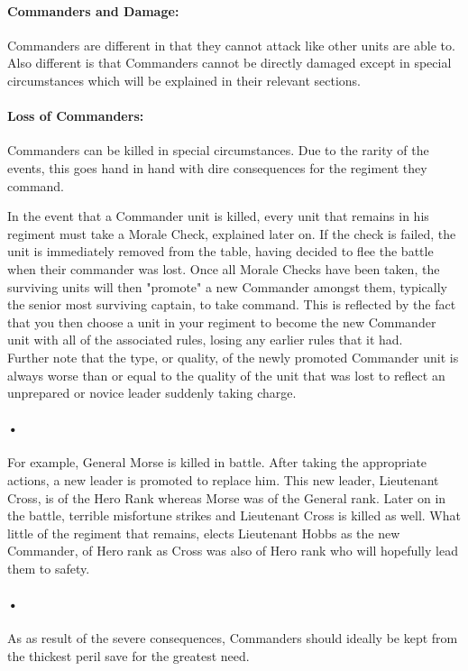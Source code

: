 \documentclass{article}
\begin{document}
\paragraph{Commanders and Damage:} Commanders are different in that they cannot attack like other units are able to. Also different is that Commanders cannot be directly damaged except in special circumstances which will be explained in their relevant sections.

\paragraph{Loss of Commanders:} Commanders can be killed in special circumstances. Due to the rarity of the events, this goes hand in hand with dire consequences for the regiment they command.

In the event that a Commander unit is killed, every unit that remains in his regiment must take a Morale Check, explained later on. If the check is failed, the unit is immediately removed from the table, having decided to flee the battle when their commander was lost. Once all Morale Checks have been taken, the surviving units will then "promote" a new Commander amongst them, typically the senior most surviving captain, to take command. This is reflected by the fact that you then choose a unit in your regiment to become the new Commander unit with all of the associated rules, losing any earlier rules that it had.
\\
Further note that the type, or quality, of the newly promoted Commander unit is always worse than or equal to the quality of the unit that was lost to reflect an unprepared or novice leader suddenly taking charge.

\paragraph{•}
For example, General Morse is killed in battle. After taking the appropriate actions, a new leader is promoted to replace him. This new leader, Lieutenant Cross, is of the Hero Rank whereas Morse was of the General rank. Later on in the battle, terrible misfortune strikes and Lieutenant Cross is killed as well. What little of the regiment that remains, elects Lieutenant Hobbs as the new Commander, of Hero rank as Cross was also of Hero rank who will hopefully lead them to safety.

\paragraph{•}
As as result of the severe consequences, Commanders should ideally be kept from the thickest peril save for the greatest need.
\end{document}
